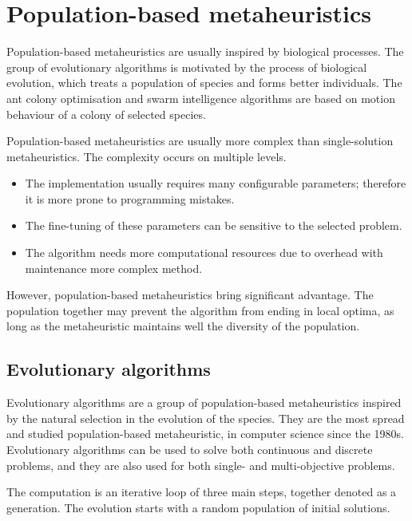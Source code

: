 \documentclass[
  print, %
  Table,   %
  nolof,     %
  nolot,     %
  11pt, %
  oneside  %
]{fithesis3}
\begin{document}
\section{Population-based metaheuristics}
\label{sec:opt-population}

Population-based metaheuristics are usually inspired by biological processes. The group of evolutionary algorithms is motivated by the process of biological evolution, which treats a population of species and forms better individuals. The ant colony optimisation and swarm intelligence algorithms are based on motion behaviour of a colony of selected species.

Population-based metaheuristics are usually more complex than single-solu\-tion metaheuristics. The complexity occurs on multiple levels.

\begin{itemize}
    \item The implementation usually requires many configurable parameters; therefore it is more prone to programming mistakes.
    \item The fine-tuning of these parameters can be sensitive to the selected problem.
    \item The algorithm needs more computational resources due to overhead with maintenance more complex method.
\end{itemize}

However, population-based metaheuristics bring significant advantage. The population together may prevent the algorithm from ending in local optima, as long as the metaheuristic maintains well the diversity of the population.

\subsection{Evolutionary algorithms}
\label{subsec:opt-popul-ea}

Evolutionary algorithms are a group of population-based metaheuristics inspired by the natural selection in the evolution of the species. They are the most spread and studied population-based metaheuristic, in computer science since the 1980s. Evolutionary algorithms can be used to solve both continuous and discrete problems, and they are also used for both single- and multi-objective problems.

The computation is an iterative loop of three main steps, together denoted as a generation. The evolution starts with a random population of initial solutions.
\end{document}
